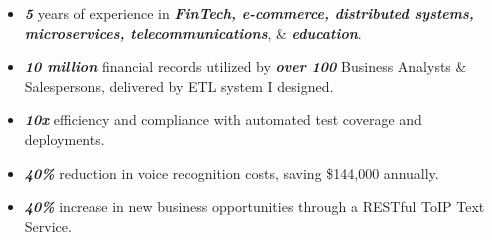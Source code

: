 \documentclass{resume} %
\begin{document}
\introduction[
      fullname=Sean Bailey,
      email=Sean.Kuo.Work@gmail.com,
      phone=(646) 344-2210,
      location =Dallas TX,
      linkedin=www.linkedin.com/in/SeanBailey777,
      github=github.com/SeanBailey777
]


\begin{summary}
      \begin{itemize}
            \itemsep -6pt {}
            \item \textit{\textbf{5}} years of experience in \textit{\textbf{FinTech, e-commerce, distributed systems, microservices, telecommunications}}, \& \textit{\textbf{education}}.
            \item \textit{\textbf{10 million}} financial records utilized by \textit{\textbf{over 100}} Business Analysts \& Salespersons, delivered by ETL system I designed.
            \item \textit{\textbf{10x}} efficiency and compliance with automated test coverage and deployments.
            \item \textit{\textbf{40\%}} reduction in voice recognition costs, saving \$144,000 annually.
            \item \textit{\textbf{40\%}} increase in new business opportunities through a RESTful ToIP Text Service.
      \end{itemize}

\end{summary}

\skills{
\skillItem[
category=Programming Languages,
skills=C++{,} Python{,} Scala{,} Clojure{,} Java{,} Salesforce{,} Snowflake SQL{,} PostgreSQL{,} JSON{,} Shell{,} HTML\\
]
\skillItem[
category=Tools \& Frameworks,
skills=Linux{,} Git{,} Docker{,} RESTful API{,} Microservices{,} AWS{,} Azure{,} Google Cloud{,} NLP
]

}
\end{document}
